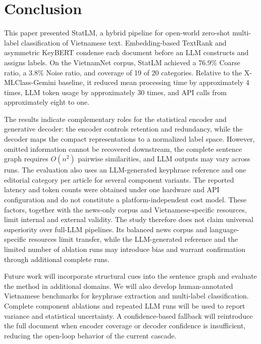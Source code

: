 \section{Conclusion}
\label{sec:conclusion}
This paper presented StatLM, a hybrid pipeline for open-world zero-shot multi-label
classification of Vietnamese text. Embedding-based TextRank and asymmetric
KeyBERT condense each document before an LLM constructs and assigns labels. On the
VietnamNet corpus, StatLM achieved a 76.9\% Coarse ratio, a 3.8\% Noise ratio, and
coverage of 19 of 20 categories. Relative to the X-MLClass-Gemini baseline,
it reduced mean processing time by approximately $4$ times, LLM token usage by
approximately $30$ times, and API calls from approximately eight to one.

The results indicate complementary roles for the statistical encoder and generative
decoder: the encoder controls retention and redundancy, while the decoder maps the
compact representations to a normalized label space. However, omitted information
cannot be recovered downstream, the complete sentence graph requires $O(n^2)$
pairwise similarities, and LLM outputs may vary across runs. The evaluation also
uses an LLM-generated keyphrase reference and one editorial category per article for several component variants. The reported latency and token
counts were obtained under one hardware and API configuration and do not constitute
a platform-independent cost model. These factors, together with the news-only corpus
and Vietnamese-specific resources, limit internal and external validity.
The study therefore does not claim universal superiority over full-LLM pipelines. Its balanced news corpus and language-specific resources limit transfer, while the LLM-generated reference and the limited number of ablation runs may introduce bias and warrant confirmation through additional complete runs.



Future work will incorporate structural cues into the sentence graph and evaluate
the method in additional domains. We will also develop human-annotated Vietnamese
benchmarks for keyphrase extraction and multi-label classification. Complete
component ablations and repeated LLM runs will be used to report variance and
statistical uncertainty. A confidence-based fallback will reintroduce the full
document when encoder coverage or decoder confidence is insufficient, reducing the
open-loop behavior of the current cascade.

